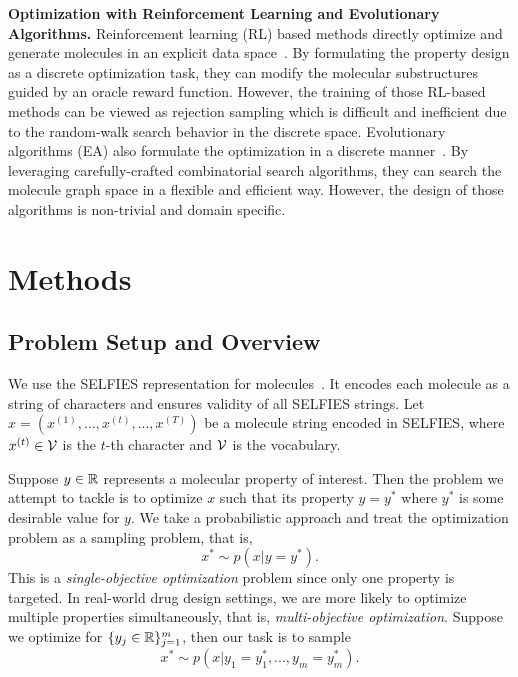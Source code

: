 \documentclass[accepted]{uai2023} %
\begin{document}
\textbf{Optimization with Reinforcement Learning and Evolutionary Algorithms.}
Reinforcement learning (RL) based methods directly optimize and generate molecules in an explicit data space~\citep{you2018graph,zhou2019optimization,jin2020multi,gottipati2020learning}. By formulating the property design as a discrete optimization task, they can modify the molecular substructures guided by an oracle reward function. However, the training of those RL-based methods can be viewed as rejection sampling which is difficult and inefficient due to the random-walk search behavior in the discrete space. Evolutionary algorithms (EA) also formulate the optimization in a discrete manner~\citep{nigam2020augmenting,jensen2019graph,xie2021mars,fu2021differentiable,fu2021mimosa}. By leveraging carefully-crafted combinatorial search algorithms, they can search the molecule graph space in a flexible and efficient way. However, the design of those algorithms is non-trivial and domain specific.


\section{Methods}
\subsection{Problem Setup and Overview}
We use the SELFIES representation for molecules~\citep{krenn2020self}. It encodes each molecule as a string of characters and ensures validity of all SELFIES strings. Let $x = (x^{(1)}, ..., x^{(t)},..., x^{(T)})$ be a molecule string encoded in SELFIES, where $x^{(t)} \in {\mathcal{V}}$ is the $t$-th character and ${\mathcal{V}}$ is the vocabulary.

Suppose $y \in {\mathbb{R}}$ represents a molecular property of interest. 
Then the problem we attempt to tackle is to optimize $x$ such that its property $y = y^*$ where $y^*$ is some desirable value for $y$. We take a probabilistic approach and treat the optimization problem as a sampling problem, that is, 
\begin{equation}
\label{eq:t1}
 x^* \sim p(x | y = y^*).   
\end{equation}
This is a \textit{single-objective optimization} problem since only one property is targeted. In real-world drug design settings, we are more likely to optimize multiple properties simultaneously, that is, \textit{multi-objective optimization}. Suppose we optimize for $\{y_j \in {\mathbb{R}} \}_{j=1}^m$, then our task is to sample
\begin{equation}
\label{eq:t2}
 x^* \sim p(x | y_1 = y_1^*, ..., y_m = y_m^*).   
\end{equation}
\end{document}
